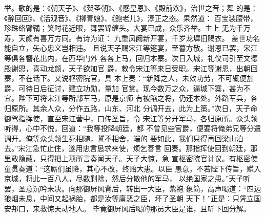 举。歌的是：《朝天子》、《贺圣朝》、《感皇恩》、《殿前欢》，治世之音；舞
的是：《醉回回》、《活观音》、《柳青娘》、《鲍老儿》，淳正之态。果然道：
百宝装腰带，珍珠络臂鞲；笑时花近眼，舞罢锦缠头。大宴已成，众乐齐举。主上
无为千万寿，天颜有喜万方同。有诗为证：
九重凤阙新开宴，千岁龙墀旧赐衣。
盖世功名能自立，矢心忠义岂相违。
且说天子赐宋江等筵宴，至暮方散。谢恩已罢，宋江等俱各簪花出内，在西华门外
各各上马，回归本寨。次日入城，礼仪司引至文德殿谢恩，喜动龙颜，天子欲加官
爵，敕令宋江等来日受职。宋江等谢恩，出朝回寨，不在话下。又说枢密院官，具
本上奏：“新降之人，未效功劳，不可辄便加爵，可待日后征讨，建立功勋，量加
官赏。现今数万之众，逼城下寨，甚为不宜。陛下可将宋江等所部军马，原是京师
有被陷之将，仍还本处。外路军兵，各归原所。其余人众，分作五路，山东、河北
分调开去，此为上策。”次日，天子命御驾指挥使，直至宋江营中，口传圣旨，令
宋江等分开军马，各归原所。众头领听得，心中不悦，回道：“我等投降朝廷，都
不曾见些官爵，便要将俺弟兄等分遣调开。俺等众头领生死相随，誓不相舍，端的
要如此，我们只得再回梁山泊去。”宋江急忙止住，遂用忠言恳求来使，烦乞善言
回奏。那指挥使回到朝廷，那里敢隐蔽，只得把上项所言奏闻天子。天子大惊，急
宣枢密院官计议。有枢密使童贯奏道：“这厮们虽降，其心不改，终贻大患。以臣
愚意，不若陛下传旨，赚入京城，将此一百八人，尽数剿除，然后分散他的军马，
以绝国家之患。”天子听罢，圣意沉吟未决。向那御屏风背后，转出一大臣，紫袍
象简，高声喝道：“四边狼烟未息，中间又起祸胎，都是汝等庸恶之臣，坏了圣朝
天下！”正是：只凭立国安邦口，来救惊天动地人。
毕竟御屏风后喝的那员大臣是谁，且听下回分解。